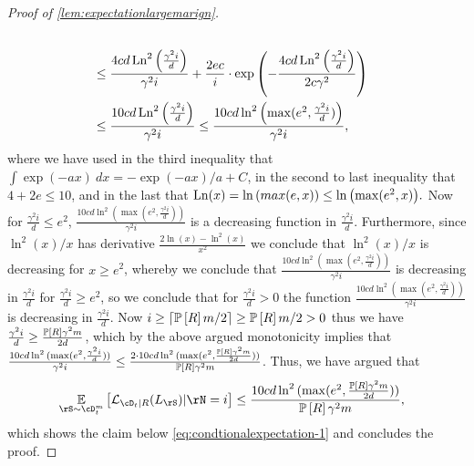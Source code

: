 \begin{proof}[Proof of \cref{lem:expectationlargemarign}]
\begin{align*}
        \\
        &\leq \frac{4cd\operatorname{\mathrm{Ln}}^{2}{\left( \frac{\gamma^{2}i}{d}\right)}}{\gamma^{2}i}+
        \frac{2ec}{i} \cdot \exp\left(-\frac{4cd\operatorname{\mathrm{Ln}}^{2}{\left( \frac{\gamma^{2}i}{d}\right)}}{2c\gamma^{2}} \right) 
        \\
        &\leq 
        \frac{10cd\operatorname{\mathrm{Ln}}^{2}{\left( \frac{\gamma^{2}i}{d}\right)}}{\gamma^{2}i}
        \leq\frac{10cd\ln^{2}{\left( \max(e^{2},\frac{\gamma^{2}i}{d})\right)}}{\gamma^{2}i},
    \end{align*}
    where we have used in the third inequality that $ \int\exp(-ax) \ dx= -\exp(-ax)/a +C$, in the second to last inequality that $ 4+2e\leq 10 $, and in the last that $ \operatorname{\mathrm{Ln}}(x)=\ln{\left(max(e,x) \right)}\leq\ln{\left(\max(e^{2},x)  \right)}.$ 
    Now for $ \frac{\gamma^{2}i}{d}\leq e^{2}  $, $ \frac{10cd\ln^{2}{( \max(e^{2},\frac{\gamma^{2}i}{d}))}}{\gamma^{2}i} $  is a decreasing function in $ \frac{\gamma^{2}i}{d}$. 
    Furthermore, since $ \ln^2{\left(x \right)}/x $ has derivative $ \frac{2\ln{\left(x \right)}-\ln^2{\left(x \right)}}{x^2} $ we conclude that $ \ln^2{\left(x \right)}/x $ is decreasing for $ x\geq e^{2} $, whereby we conclude that $ \frac{10cd\ln^{2}{( \max(e^{2},\frac{\gamma^{2}i}{d}))}}{\gamma^{2}i} $ is decreasing in $ \frac{\gamma^{2}i}{d} $ for $ \frac{\gamma^{2}i}{d} \geq e^{2}$, so we conclude that for $ \frac{\gamma^{2}i}{d} >0 $ the function $ \frac{10cd\ln^{2}{( \max(e^{2},\frac{\gamma^{2}i}{d}))}}{\gamma^{2}i} $ is decreasing in $ \frac{\gamma^{2}i}{d}  $. 
    Now $ i\geq \left\lceil\operatorname*{\mathbb{P}}\left[R\right]m/2\right\rceil\geq \operatorname*{\mathbb{P}}\left[R\right]m/2 >0$ thus we have $ \frac{\gamma^{2}i}{d}\geq \frac{\operatorname*{\mathbb{P}}\left[R\right]\gamma^{2}m}{2d}$, which by the above argued monotonicity implies that $ \frac{10cd\ln^{2}{( \max(e^{2},\frac{\gamma^{2}i}{d}))}}{\gamma^{2}i} \leq \frac{2\cdot10 cd\ln^{2}{( \max(e^{2},\frac{\operatorname*{\mathbb{P}}\left[R\right]\gamma^{2}m}{2d}))}}{\operatorname*{\mathbb{P}}\left[R\right]\gamma^{2}m} $. 
    Thus, we have argued that 
    \begin{align*}
        &\e_{\rS\sim\cD_{t}^{m}}\left[\ls_{\cD_{t}|R}(L_{\rS})|\rN=i\right]
        \leq \frac{10cd\ln^{2}{( \max(e^{2},\frac{\p\left[R\right]\gamma^{2}m}{2d}))}}{\p\left[R\right]\gamma^{2}m},
    \end{align*}
    which shows the claim below \cref{eq:condtionalexpectation-1} and concludes the proof. 
\end{proof}